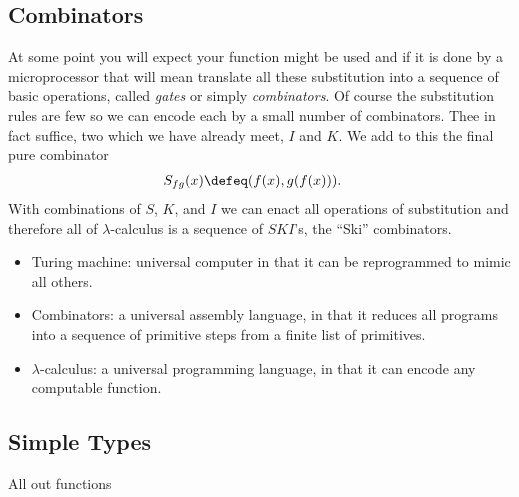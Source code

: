 \subsection{Combinators}
At some point you will expect your function might be used and if it is done 
by a microprocessor that will mean translate all these substitution into a 
sequence of basic operations, called \emph{gates} or simply \emph{combinators}.
Of course the substitution rules are few so we can encode each by a small 
number of combinators.  Thee in fact suffice, two which we have already meet, 
$I$ and $K$.  We add to this the final pure combinator 
\begin{align*}
    S_{fg}(x) & \defeq (f(x),g(f(x))).
\end{align*}
With combinations of $S$, $K$, and $I$ we can enact all operations of substitution
and therefore all of $\lambda$-calculus is a sequence of $SKI$'s, the ``Ski'' combinators.

\begin{itemize}
    \item Turing machine: universal computer in that it can be reprogrammed to 
    mimic all others.

    \item Combinators: a universal assembly language, in that it reduces all 
    programs into a sequence of primitive steps from a finite list of primitives.

    \item $\lambda$-calculus: a universal programming language, in that it can 
    encode any computable function.

\end{itemize}


\subsection{Simple Types}
All out functions 